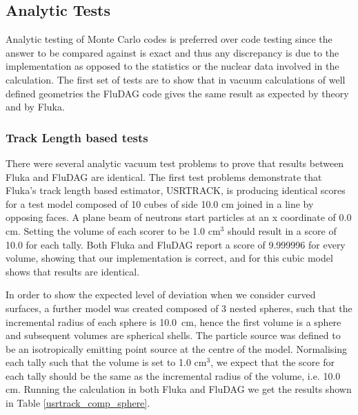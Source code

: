 \documentclass{anstrans}[12pt]
\begin{document}
\subsection{Analytic Tests}
Analytic testing of Monte Carlo codes is preferred over code testing since the
answer to be compared against is exact and thus any discrepancy is due
to the implementation as opposed to the statistics or the nuclear data
involved in the calculation. The first set of tests are to show that in
vacuum calculations of well defined geometries the FluDAG code gives
the same result as expected by theory and by Fluka.

\subsubsection*{Track Length based tests}
There were several analytic vacuum test problems to prove that results
between Fluka and FluDAG are identical. The first test problems
demonstrate that Fluka's track length based estimator, USRTRACK, 
is producing identical scores for a test model composed of 
10 cubes of side 10.0 cm joined in a line by opposing faces. A plane 
beam of neutrons start particles at an x coordinate of 0.0 cm. Setting 
the volume of each scorer to be 1.0 cm$^3$ should result in a score of 
10.0 for each tally. Both Fluka and FluDAG report a score of 9.999996 for every volume,
showing that our implementation is correct, and for this cubic model
shows that results are identical.


In order to show the expected level of deviation when we consider
curved surfaces, a further model was created composed of 3 nested
spheres, such that the incremental radius of each sphere is 10.0\ cm,
hence the first volume is a sphere and subsequent volumes are
spherical shells. The particle source was defined to be an
isotropically emitting point source at the centre of the
model. Normalising each tally such that the volume is set to 1.0 cm$^3$, 
we expect that the score for each tally should be the same as the
incremental radius of the volume, i.e. 10.0 cm. Running the calculation
in both Fluka and FluDAG we get the results shown in Table \ref{usrtrack_comp_sphere}.
\end{document}
